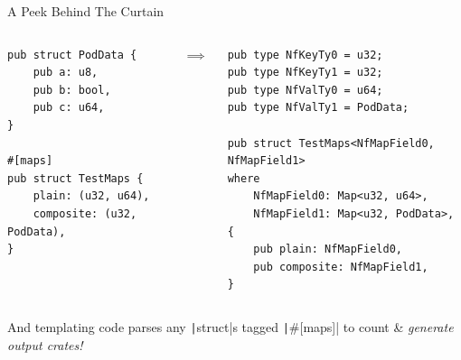 \documentclass[aspectratio=169,xcolor={dvipsnames}
]{beamer}
\begin{document}
\begin{frame}[fragile=singleslide]{A Peek Behind The Curtain }
	\begin{columns}
		\begin{column}{0.5\linewidth}
			\begin{verbatim}
pub struct PodData {
	pub a: u8,
	pub b: bool,
	pub c: u64,
}

#[maps]
pub struct TestMaps {
	plain: (u32, u64),
	composite: (u32, PodData),
}
			\end{verbatim}
		\end{column}
			\hspace{-9em}$\bm\implies$\hspace{2em}
		\begin{column}{0.45\linewidth}
			\begin{verbatim}
pub type NfKeyTy0 = u32;
pub type NfKeyTy1 = u32;
pub type NfValTy0 = u64;
pub type NfValTy1 = PodData;

pub struct TestMaps<NfMapField0, NfMapField1>
where
	NfMapField0: Map<u32, u64>,
	NfMapField1: Map<u32, PodData>,
{
	pub plain: NfMapField0,
	pub composite: NfMapField1,
}
			\end{verbatim}
		\end{column}
	\end{columns}
	And templating code parses any \texttt|struct|s tagged \texttt|#[maps]| to count \& \emph{generate output crates!}
\end{frame}

\end{document}
